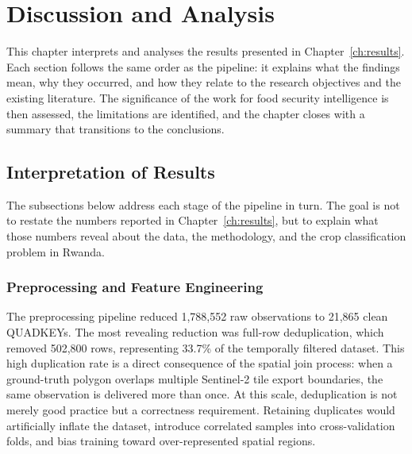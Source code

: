 
\chapter{Discussion and Analysis}
\label{ch:discussion}

This chapter interprets and analyses the results presented in
Chapter~\ref{ch:results}. Each section follows the same order as the
pipeline: it explains what the findings mean, why they occurred, and
how they relate to the research objectives and the existing literature.
The significance of the work for food security intelligence is then
assessed, the limitations are identified, and the chapter closes with
a summary that transitions to the conclusions.


\section{Interpretation of Results}
\label{sec:interpretation}

The subsections below address each stage of the pipeline in turn.
The goal is not to restate the numbers reported in
Chapter~\ref{ch:results}, but to explain what those numbers reveal
about the data, the methodology, and the crop classification problem
in Rwanda.


\subsection{Preprocessing and Feature Engineering}
\label{subsec:disc_preprocessing}

The preprocessing pipeline reduced 1,788,552 raw observations to
21,865 clean QUADKEYs. The most revealing reduction was full-row
deduplication, which removed 502,800 rows, representing 33.7\% of the temporally
filtered dataset. This high duplication rate is a direct consequence
of the spatial join process: when a ground-truth polygon overlaps
multiple Sentinel-2 tile export boundaries, the same observation is
delivered more than once. At this scale, deduplication is not merely
good practice but a correctness requirement. Retaining duplicates
would artificially inflate the dataset, introduce correlated samples
into cross-validation folds, and bias training toward over-represented
spatial regions.

